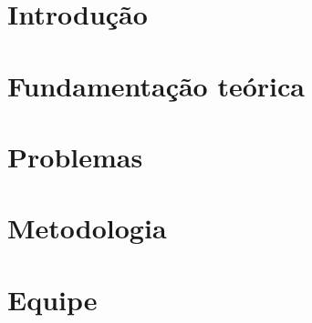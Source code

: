 \section{Introdução} %
\label{sec:introdu_o}
 

\section{Fundamentação teórica} %
\label{sec:fundamenta_o_te_rica}
 

\section{Problemas}
\label{sec:problema}



\section{Metodologia} %
\label{sec:metodologia}
 

\section{Equipe} %
\label{sec:equipe}


%

%
